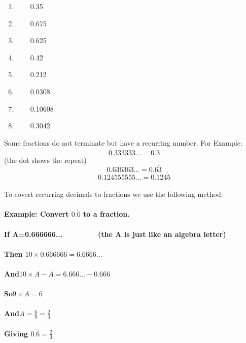 \documentclass[a4paper,12pt]{article}
\begin{document}
 
 
\begin{tcolorbox}[colback=red!0!white, colframe=gray ,title=\subsubsection{Convert the following decimals to fractions. (you can use a claculator to simplify the fractions)}\label{Dec1}]
\begin{multicols}{2}
\begin{enumerate}
\item ~~~~0.35
\item ~~~~0.675
\item ~~~~0.625
\item ~~~~0.42
\item ~~~~0.212
\item ~~~~0.0308
\item ~~~~0.10608
\item ~~~~0.3042
\end{enumerate}
\end{multicols}
\end{tcolorbox}\vspace{0.5cm}
Some fractions do not terminate but have a recurring number. For Example: \[~~~ 0.333333...=0.\dot{3}\]   (the dot shows the repeat)
\[~~~ 0.636363...=0.\dot{6}\dot{3}\]
\[~~~ 0.124555555...=0.124\dot{5}\]
\\
To covert recurring decimals to fractions we use the following method:\\
\\
\textbf{Example: Convert $0.\dot{6}$ to a fraction.}\\
\\
\textbf{
If \hspace{1.4cm}A=0.666666...  ~~~~~~~~(the A is just like an algebra letter)\\
\\
Then \hspace{.8cm}$10\times0.666666=6.6666...$\\
\\
And\hspace{1cm}$10 \times A -A=6.666...-0.666$\\
\\
So\hspace{1.3cm}$9 \times A=6$\\
\\
And\hspace{1cm}$ A=\frac{6}{9}=\frac{2}{3}$\\
\\
Giving\hspace{0.6cm} $0.\dot{6}=\frac{2}{3}$
}\vspace{0.75cm}
 
\end{document}
